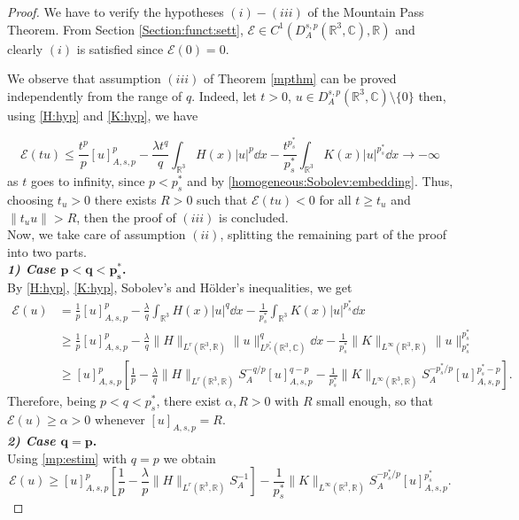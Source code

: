 \documentclass[leqno,11pt]{amsart}
\newcommand{\R}{\mathbb R}
\newcommand{\C}{\mathbb C}
\newcommand{\bs}{\boldsymbol}
\newcommand{\cE}{{\mathcal E}}
\numberwithin{equation}{section}
\begin{document}
\begin{proof}
We have to verify the hypotheses $(i)-(iii)$ of the Mountain Pass Theorem.
From Section \ref{Section:funct:sett}, $\cE\in C^1(D^{s,p}_A(\R^3,\C),\R)$ and clearly  $(i)$ is satisfied since $\cE(0)=0$.

We observe that assumption $(iii)$ of Theorem \ref{mpthm} can be proved independently from the range of $q$. Indeed, let $t>0$, $u\in D^{s,p}_A(\R^3,\C) \setminus\{0\}$ then, using \eqref{H:hyp} and \eqref{K:hyp}, we have
 
\begin{equation}\label{iii}
    \cE(tu)\le \frac{t^p}{p}[u]^p_{A,s,p} -\frac{\lambda t^q}{q}\int_{\R^3}H(x)|u|^p\dd x - \frac{t^{p^*_s}}{p^*_s}\int_{\R^3} K(x)|u|^{p^*_s} \dd x
     \to -\infty
\end{equation}
as $t$ goes to infinity,  since $p<p^*_s$ and by \eqref{homogeneous:Sobolev:embedding}.
Thus, choosing $t_u>0$ there exists $R>0$ such that $\cE(tu)<0$ for all $t\ge t_u$ and $\|t_u u\|>R$, then the proof of $(iii)$ is concluded.\\
Now, we take care of assumption $(ii)$, splitting the remaining part of the proof into two parts.\\
\textbf{\textit{1) Case ${\bs{ p<q<p^*_s}}$}.}\\
By \eqref{H:hyp}, \eqref{K:hyp}, Sobolev's and H\"older's inequalities, we get
\begin{equation}\label{mp:estim}\begin{aligned}
\cE(u)&= \frac1p[u]_{A,s,p}^p-\frac{\lambda}{q}\int_{\R^3}H(x)|u|^q\dd x-\frac{1}{p^*_s}\int_{\R^3}K(x)|u|^{p^*_s}\dd x
\\&\ge \frac1p[u]_{A,s,p}^p-\frac{\lambda}{q}\|H\|_{L^r(\R^3,\R)}\|u\|_{L^{p^*_s}(\R^3,\C)}^q\dd x-\frac{1}{p^*_s}\|K\|_{L^\infty(\R^3,\R)}\|u\|^{p^*_s}_{p^*_s}\\
&\ge [u]_{A,s,p}^p\left[\frac1p- \frac{\lambda}{q}\|H\|_{L^r(\R^3,\R)}S_A^{-q/p}[u]_{A,s,p}^{q-p}-\frac{1}{p^*_s}\|K\|_{L^\infty(\R^3,\R)} S_A^{-p^*_s/p}[u]_{A,s,p}^{p^*_s-p}\right].
\end{aligned}\end{equation}
Therefore, being $p<q<p^*_s$, there exist $\alpha, R>0$ with $R$ small enough,
 so that $\cE(u)\ge\alpha>0$
whenever $[u]_{A,s,p}=R$.\\
\textbf{\textit{2) Case ${\bs{ q=p}}$}.}\\
Using \eqref{mp:estim} with $q=p$ we obtain 
$$\cE(u)\ge [u]_{A,s,p}^p\left[\frac1p- \frac{\lambda}{p}\|H\|_{L^r(\R^3,\R)}S_A^{-1}\right]-\frac{1}{p^*_s}\|K\|_{L^\infty(\R^3,\R)} S_A^{-p^*_s/p}[u]_{A,s,p}^{p^*_s}.$$

\end{proof}
\end{document}
